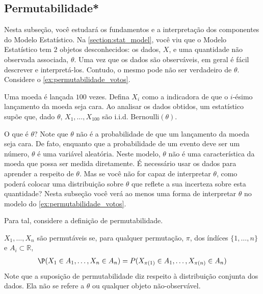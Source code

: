 
\subsection{Permutabilidade*}

Nesta subseção, você estudará os fundamentos e
a interpretação dos componentes do Modelo Estatístico.
Na \cref{section:stat_model}, você viu que
o Modelo Estatístico tem $2$ objetos desconhecidos:
os dados, $X$, e uma
quantidade não observada associada, $\theta$.
Uma vez que os dados são observáveis,
em geral é fácil descrever e interpretá-los.
Contudo, o mesmo pode não ser verdadeiro de $\theta$.
Considere o \cref{ex:permutabilidade_votos}.

\begin{example}
 \label{ex:permutabilidade_votos}
 Uma moeda é lançada $100$ vezes.
 Defina $X_{i}$ como a indicadora de que
 o $i$-ésimo lançamento da moeda seja cara.
 Ao analisar os dados obtidos, 
 um estatístico supõe que, dado $\theta$,
 $X_{1},\ldots,X_{100}$ são i.i.d. 
 $\text{Bernoulli}(\theta)$.
\end{example}

O que é $\theta$? 
Note que $\theta$ não é a probabilidade de que 
um lançamento da moeda seja cara.
De fato, enquanto que a probabilidade de um 
evento deve ser um número,
$\theta$ é uma variável aleatória.
Neste modelo, $\theta$ não é uma 
característica da moeda que
possa ser medida diretamente.
É necessário usar os dados para 
aprender a respeito de $\theta$.
Mas se você não for capaz de interpretar $\theta$,
como poderá colocar uma distribuição sobre $\theta$ que
reflete a sua incerteza sobre esta quantidade?
Nesta subseção você verá ao menos uma forma de
interpretar $\theta$ no modelo do
\cref{ex:permutabilidade_votos}.

Para tal, considere a definição de permutabilidade.

\begin{definition}
 $X_{1},\ldots,X_{n}$ são permutáveis se,
 para qualquer permutação, $\pi$, dos índíces 
 $\{1,\ldots,n\}$ e $A_{i} \subset \mathbb{R}$,
 \begin{align*}
  \P(X_{1} \in A_{1},\ldots,X_{n} \in A_{n})
  = P(X_{\pi(1)} \in A_{1},\ldots,X_{\pi(n)} \in A_{n})
 \end{align*}
 Note que a suposição de permutabilidade diz respeito à
 distribuição conjunta dos dados.
 Ela não se refere a $\theta$ ou 
 qualquer objeto não-observável.
\end{definition}

